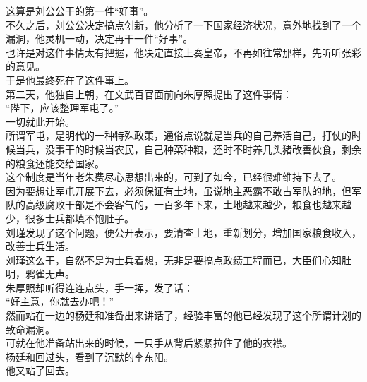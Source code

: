 \begin{multicols}{\theparacolNo}
这算是刘公公干的第一件“好事”。\\

不久之后，刘公公决定搞点创新，他分析了一下国家经济状况，意外地找到了一个漏洞，他灵机一动，决定再干一件“好事”。\\

也许是对这件事情太有把握，他决定直接上奏皇帝，不再如往常那样，先听听张彩的意见。\\

于是他最终死在了这件事上。\\

第二天，他独自上朝，在文武百官面前向朱厚照提出了这件事情：\\

“陛下，应该整理军屯了。”\\

一切就此开始。\\

所谓军屯，是明代的一种特殊政策，通俗点说就是当兵的自己养活自己，打仗的时候当兵，没事干的时候当农民，自己种菜种粮，还时不时养几头猪改善伙食，剩余的粮食还能交给国家。\\

这个制度是当年老朱费尽心思想出来的，可到了如今，已经很难维持下去了。\\

因为要想让军屯开展下去，必须保证有土地，虽说地主恶霸不敢占军队的地，但军队的高级腐败干部是不会客气的，一百多年下来，土地越来越少，粮食也越来越少，很多士兵都填不饱肚子。\\

刘瑾发现了这个问题，便公开表示，要清查土地，重新划分，增加国家粮食收入，改善士兵生活。\\

刘瑾这么干，自然不是为士兵着想，无非是要搞点政绩工程而已，大臣们心知肚明，鸦雀无声。\\

朱厚照却听得连连点头，手一挥，发了话：\\

“好主意，你就去办吧！”\\

然而站在一边的杨廷和准备出来讲话了，经验丰富的他已经发现了这个所谓计划的致命漏洞。\\

可就在他准备站出来的时候，一只手从背后紧紧拉住了他的衣襟。\\

杨廷和回过头，看到了沉默的李东阳。\\

他又站了回去。\\


\end{multicols}
